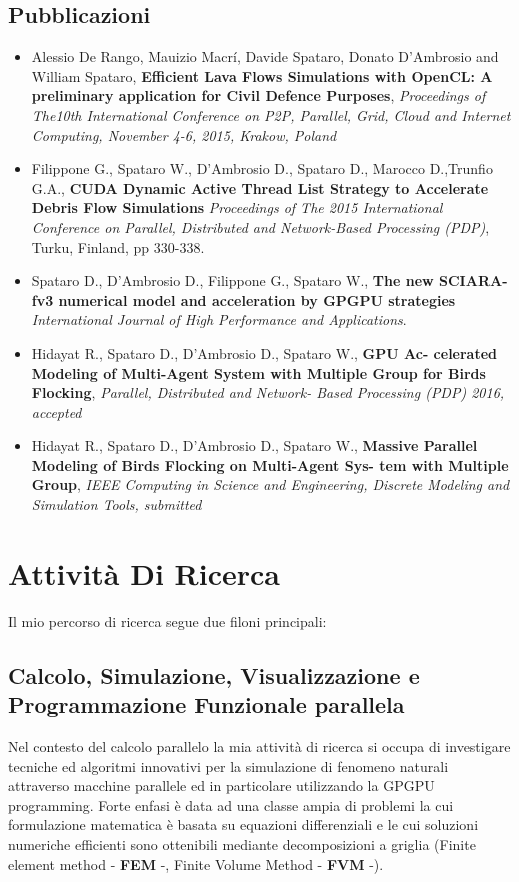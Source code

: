 \subsection{Pubblicazioni}
\begin{itemize}
	\item Alessio De Rango, Mauizio Macr\'i, Davide Spataro, Donato D'Ambrosio and
	William Spataro, \textbf{Efficient Lava Flows Simulations with OpenCL: A
		preliminary application for Civil Defence Purposes}, \emph{Proceedings of
		The10th International Conference on P2P, Parallel, Grid, Cloud and Internet
		Computing, November 4-6, 2015, Krakow, Poland}
	
	\item Filippone G., Spataro W., D'Ambrosio D., Spataro D., 
	Marocco D.,Trunfio G.A., \textbf{CUDA Dynamic Active Thread List Strategy 
		to Accelerate Debris Flow Simulations} \emph{Proceedings of The 2015 International Conference on Parallel, 
		Distributed and Network-Based Processing (PDP)}, Turku, Finland, pp 330-338.
	
	\item Spataro D., D'Ambrosio D., Filippone G., Spataro W., \textbf{The new
		SCIARA-fv3 numerical model and acceleration by GPGPU strategies}
	\emph{International Journal of High Performance and Applications}.
	
	\item Hidayat R., Spataro D., D’Ambrosio D., Spataro W., \textbf{GPU Ac-
		celerated Modeling of Multi-Agent System with Multiple
		Group for Birds Flocking}, \emph{Parallel, Distributed and Network-
		Based Processing (PDP) 2016, accepted}
	\item Hidayat R., Spataro D., D’Ambrosio D., Spataro W., \textbf{Massive
		Parallel Modeling of Birds Flocking on Multi-Agent Sys-
		tem with Multiple Group}, \emph{IEEE Computing in Science and
		Engineering, Discrete Modeling and Simulation Tools, submitted}
\end{itemize}
\section{Attività Di Ricerca}
Il mio percorso di ricerca segue due filoni principali:
\subsection{Calcolo, Simulazione, Visualizzazione e Programmazione Funzionale
	parallela}
Nel contesto del calcolo parallelo la mia attività di ricerca si occupa di
investigare tecniche ed algoritmi innovativi per la simulazione di fenomeno
naturali attraverso macchine parallele ed in particolare utilizzando la GPGPU
programming. Forte enfasi è data ad una classe ampia di problemi la cui
formulazione matematica è basata su equazioni differenziali e le cui
soluzioni numeriche efficienti sono ottenibili mediante decomposizioni a griglia
(Finite element method - \textbf{FEM} -, Finite Volume Method - \textbf{FVM}
-).



